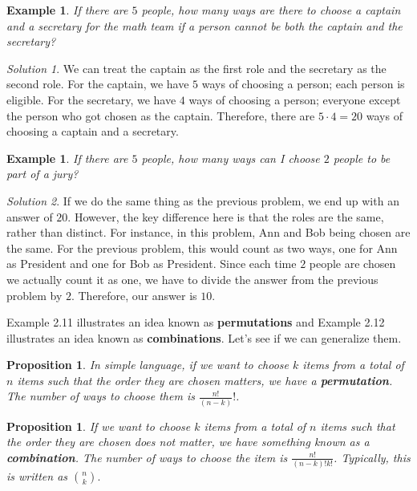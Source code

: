 \documentclass[letterpaper]{article}
\newtheorem{prop}[thm]{Proposition}
\newtheorem{example}[thm]{Example}
\theoremstyle{remark}
\newtheorem*{solution}{Solution}
\theoremstyle{definition}
\begin{document}
\begin{example}
If there are $5$ people, how many ways are there to choose a captain and a secretary for the math team if a person cannot be both the captain and the secretary?
\end{example}

\begin{solution}
We can treat the captain as the first role and the secretary as the second role. For the captain, we have $5$ ways of choosing a person; each person is eligible. For the secretary, we have $4$ ways of choosing a person; everyone except the person who got chosen as the captain. Therefore, there are $5\cdot 4=20 $ ways of choosing a captain and a secretary.
\end{solution}

\bigskip

\begin{example}
If there are $5$ people, how many ways can I choose $2$ people to be part of a jury?
\end{example}

\begin{solution}
If we do the same thing as the previous problem, we end up with an answer of $20$. However, the key difference here is that the roles are the same, rather than distinct. For instance, in this problem, Ann and Bob being chosen are the same. For the previous problem, this would count as two ways, one for Ann as President and one for Bob as President. Since each time $2$ people are chosen we actually count it as one, we have to divide the answer from the previous problem by $2$. Therefore, our answer is $10$.
\end{solution}

Example 2.11 illustrates an idea known as \textbf{permutations} and Example 2.12 illustrates an idea known as \textbf{combinations}. Let's see if we can generalize them.

\bigskip

\begin{mdframed}
\begin{prop}
In simple language, if we want to choose $k$ items from a total of $n$ items such that the order they are chosen matters, we have a \textbf{permutation}. The number of ways to choose them is $\frac{n!}{(n-k)}!$.
\end{prop}
\end{mdframed}

\begin{mdframed}
\begin{prop}
If we want to choose $k$ items from a total of $n$ items such that the order they are chosen does not matter, we have something known as a \textbf{combination}. The number of ways to choose the item is $\frac{n!}{(n-k)!k!}$. Typically, this is written as $\binom{n}{k}.$
\end{prop}
\end{mdframed}
\end{document}

